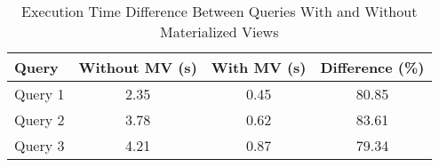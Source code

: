 
\begin{table}[H]
    \centering
    \begin{tabular}{@{}lccc@{}}
        \toprule
        \textbf{Query} & \textbf{Without MV (s)} & \textbf{With MV (s)} & \textbf{Difference (\%)} \\ \midrule
        Query 1        & 2.35                   & 0.45                 & 80.85                   \\
        Query 2        & 3.78                   & 0.62                 & 83.61                   \\
        Query 3        & 4.21                   & 0.87                 & 79.34                   \\ \bottomrule
    \end{tabular}
    \caption{Execution Time Difference Between Queries With and Without Materialized Views}
    \label{tab:performance}
\end{table}
